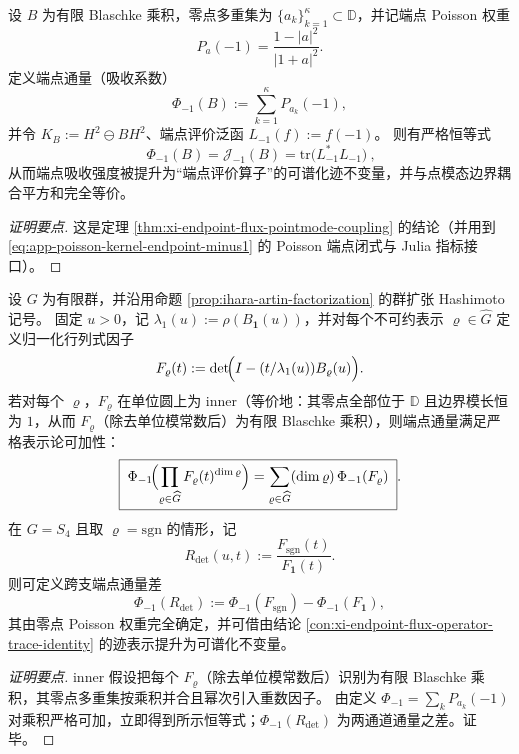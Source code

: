 \begin{conclusion}\label{con:xi-endpoint-flux-operator-trace-identity}
设 \(B\) 为有限 Blaschke 乘积，零点多重集为 \(\{a_k\}_{k=1}^{\kappa}\subset\mathbb{D}\)，并记端点 Poisson 权重
\[
P_a(-1)=\frac{1-|a|^2}{|1+a|^2}.
\]
定义端点通量（吸收系数）
\[
\Phi_{-1}(B):=\sum_{k=1}^{\kappa}P_{a_k}(-1),
\]
并令 \(K_B:=H^2\ominus BH^2\)、端点评价泛函 \(L_{-1}(f):=f(-1)\)。
则有严格恒等式
\[
\boxed{\ \Phi_{-1}(B)=\mathcal{J}_{-1}(B)=\mathrm{tr}\!\bigl(L_{-1}^\ast L_{-1}\bigr)\ },
\]
从而端点吸收强度被提升为“端点评价算子”的可谱化迹不变量，并与点模态边界耦合平方和完全等价。
\end{conclusion}
\begin{proof}[证明要点]
这是定理 \ref{thm:xi-endpoint-flux-pointmode-coupling} 的结论（并用到 \eqref{eq:app-poisson-kernel-endpoint-minus1} 的 Poisson 端点闭式与 Julia 指标接口）。
\end{proof}

\begin{conclusion}\label{con:xi-endpoint-flux-artin-additivity}
设 \(G\) 为有限群，并沿用命题 \ref{prop:ihara-artin-factorization} 的群扩张 Hashimoto 记号。
固定 \(u>0\)，记 \(\lambda_1(u):=\rho(B_{\mathbf 1}(u))\)，并对每个不可约表示 \(\varrho\in\widehat G\) 定义归一化行列式因子
\[
F_\varrho(t):=\det\!\Bigl(I-(t/\lambda_1(u))B_\varrho(u)\Bigr).
\]
若对每个 \(\varrho\)，\(F_\varrho\) 在单位圆上为 inner（等价地：其零点全部位于 \(\mathbb D\) 且边界模长恒为 \(1\)，从而 \(F_\varrho\)（除去单位模常数后）为有限 Blaschke 乘积），则端点通量满足严格表示论可加性：
\[
\boxed{\;
\Phi_{-1}\!\Bigl(\prod_{\varrho\in\widehat G} F_\varrho(t)^{\dim\varrho}\Bigr)
=
\sum_{\varrho\in\widehat G}(\dim\varrho)\,\Phi_{-1}(F_\varrho)\; }.
\]
在 \(G=S_4\) 且取 \(\varrho=\mathrm{sgn}\) 的情形，记
\[
R_{\det}(u,t):=\frac{F_{\mathrm{sgn}}(t)}{F_{\mathbf 1}(t)}.
\]
则可定义跨支端点通量差
\[
\Phi_{-1}(R_{\det}):=\Phi_{-1}(F_{\mathrm{sgn}})-\Phi_{-1}(F_{\mathbf 1}),
\]
其由零点 Poisson 权重完全确定，并可借由结论 \ref{con:xi-endpoint-flux-operator-trace-identity} 的迹表示提升为可谱化不变量。
\end{conclusion}
\begin{proof}[证明要点]
inner 假设把每个 \(F_\varrho\)（除去单位模常数后）识别为有限 Blaschke 乘积，其零点多重集按乘积并合且幂次引入重数因子。
由定义 \(\Phi_{-1}=\sum_k P_{a_k}(-1)\) 对乘积严格可加，立即得到所示恒等式；\(\Phi_{-1}(R_{\det})\) 为两通道通量之差。证毕。
\end{proof}

